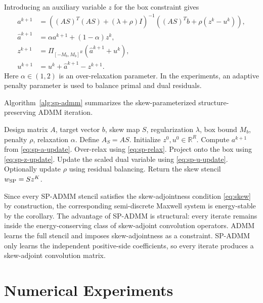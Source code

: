 \documentclass[11pt]{article}
\numberwithin{equation}{section}
\numberwithin{figure}{section}
\numberwithin{table}{section}
\newcommand{\R}{\mathbb{R}}
\begin{document}
Introducing an auxiliary variable $z$ for the box constraint gives
\begin{align}
  a^{k+1}
  &=
  \left((AS)^T(AS)+(\lambda+\rho)I\right)^{-1}
  \left((AS)^Tb+\rho(z^k-u^k)\right),
  \label{eq:sp-a-update}\\
  \widehat a^{k+1}
  &=
  \alpha a^{k+1}+(1-\alpha)z^k,
  \label{eq:sp-relax}\\
  z^{k+1}
  &=
  \Pi_{[-M_b,M_b]^R}(\widehat a^{k+1}+u^k),
  \label{eq:sp-z-update}\\
  u^{k+1}
  &=
  u^k+\widehat a^{k+1}-z^{k+1}.
  \label{eq:sp-u-update}
\end{align}
Here $\alpha\in(1,2)$ is an over-relaxation parameter. In the experiments,
an adaptive penalty parameter is used to balance primal and dual residuals.

Algorithm~\ref{alg:sp-admm} summarizes the skew-parameterized
structure-preserving ADMM iteration.

\begin{algorithm}
\caption{Skew-parameterized structure-preserving ADMM}
\label{alg:sp-admm}
\begin{algorithmic}[1]
\Require Design matrix $A$, target vector $b$, skew map $S$, regularization
$\lambda$, box bound $M_b$, penalty $\rho$, relaxation $\alpha$.
\State Define $A_S=AS$.
\State Initialize $z^0,u^0\in\R^R$.
  \State Compute $a^{k+1}$ from \eqref{eq:sp-a-update}.
  \State Over-relax using \eqref{eq:sp-relax}.
  \State Project onto the box using \eqref{eq:sp-z-update}.
  \State Update the scaled dual variable using \eqref{eq:sp-u-update}.
  \State Optionally update $\rho$ using residual balancing.
\EndFor
\State Return the skew stencil $w_{\rm SP}=Sz^K$.
\end{algorithmic}
\end{algorithm}
Since every SP-ADMM stencil satisfies the skew-adjointness condition
\eqref{eq:skew} by construction, the corresponding semi-discrete Maxwell
system is energy-stable by the corollary.
The advantage of SP-ADMM is structural: every iterate remains inside the energy-conserving class of skew-adjoint convolution operators. ADMM learns the full stencil and
imposes skew-adjointness as a constraint. SP-ADMM only learns the independent
positive-side coefficients, so every iterate produces a skew-adjoint
convolution matrix.

\section{Numerical Experiments}
\label{sec:experiments}
\end{document}
